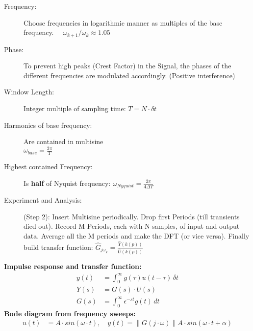 \begin{tcolorbox}[colback=brown!5!white,colframe=brown!75!black,title=\textbf{Optimising Multisine for optimal crest factor}]
\begin{description}
	\item[Frequency:] Choose frequencies in logarithmic manner as multiples of the base frequency. $\quad \omega_{k+1}/\omega_k \approx 1.05$

	\item[Phase:] To prevent high peaks (Crest Factor) in the Signal, the phases of the different frequencies are modulated accordingly. (Positive interference)
\end{description}
\end{tcolorbox}

\begin{tcolorbox}[colback=brown!5!white,colframe=brown!75!black,title=\textbf{Multisine Identification Implementation procedure}]
\begin{description}
	\item[Window Length:] Integer multiple of sampling time: $T = N \cdot \delta t$

	\item[Harmonics of base frequency:] Are contained in multisine \\ $\omega_{base} = \frac{2\pi}{T}$

	\item[Highest contained Frequency:] Is \textbf{half} of Nyquist frequency: $\omega_{Nyquist} = \frac{2\pi}{4\Delta T}$

	\item[Experiment and Analysis:] (Step 2): Insert Multisine periodically. Drop first Periods (till transients died out). Record M Periods, each with N samples, of input and output data. Average all the M periods and make the DFT (or vice versa). Finally build transfer function: $ \hat{G}_{{j\omega}_{k}} = \frac{\hat Y(k(p))}{\hat U (k(p))}$
\end{description}
\end{tcolorbox}

\begin{tcolorbox}[colback=brown!5!white,colframe=brown!75!black,title=\textbf{Nonparametric and Frequency Domain Identification Models}]
\textbf{Impulse response and transfer function:}
\begin{align*}
	y(t) &= \int_{0}^{\infty} g(\tau) u(t-\tau) \, \delta t \\
	Y(s) &= G(s)\cdot U(s) \\
	G(s) &= \int_{0}^{\infty} \epsilon^{-st} g(t) \, dt 
\end{align*}
\textbf{Bode diagram from frequency sweeps:}
\begin{align*}
	u(t) &= A \cdot sin(\omega \cdot t),\quad y(t) = \lVert G (j\cdot \omega )\rVert A \cdot sin(\omega \cdot t + \alpha)
\end{align*}
\end{tcolorbox}

